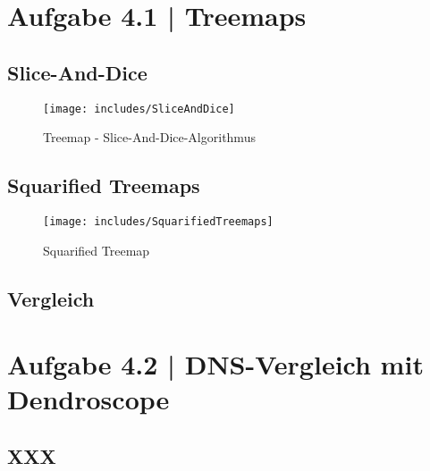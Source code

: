 \documentclass[a4paper,12pt,ngerman]{scrartcl}
\begin{document}
\pagestyle{fancy} %

\section{Aufgabe 4.1 | Treemaps}
\subsection*{Slice-And-Dice}

\begin{figure}[ht]
    \centering
    \texttt{[image: includes/SliceAndDice]}
    \caption{Treemap - Slice-And-Dice-Algorithmus}
    \label{fig:sliceAndDice}
\end{figure}

\subsection*{Squarified Treemaps}

\begin{figure}[ht]
    \centering
    \texttt{[image: includes/SquarifiedTreemaps]}
    \caption{Squarified Treemap}
    \label{fig:squarifiedTreemap}
\end{figure}

\subsection*{Vergleich}

\section{Aufgabe 4.2 | DNS-Vergleich mit Dendroscope}
\subsection*{XXX}
\end{document}
